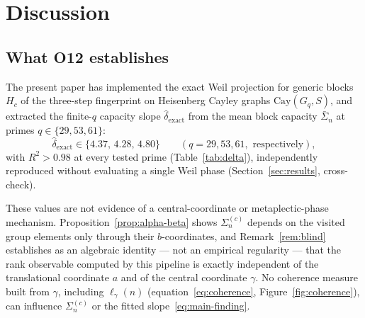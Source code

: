 \section{Discussion}
  \label{sec:discussion}

  \subsection{What O12 establishes}

    The present paper has implemented the exact Weil projection for generic blocks
    $H_c$ of the three-step fingerprint on Heisenberg Cayley graphs $\mathrm{Cay}(G_q, S)$,
    and extracted the finite-$q$ capacity slope $\hat{\delta}_{\mathrm{exact}}$ from the mean
    block capacity $\bar{\Sigma}_n$ at primes $q\in\{29,53,61\}$:
    \begin{equation}
      \hat{\delta}_{\mathrm{exact}} \in \{4.37,\,4.28,\,4.80\}
      \qquad (q=29,53,61,\text{ respectively}),
      \label{eq:main-finding}
    \end{equation}
    with $R^2 > 0.98$ at every tested prime (Table~\ref{tab:delta}), independently
    reproduced without evaluating a single Weil phase (Section~\ref{sec:results},
    cross-check).

    These values are not evidence of a central-coordinate or metaplectic-phase mechanism.
    Proposition~\ref{prop:alpha-beta} shows $\Sigma_n^{(c)}$ depends on the visited group
    elements only through their $b$-coordinates, and Remark~\ref{rem:blind} establishes as
    an algebraic identity — not an empirical regularity — that the rank observable computed
    by this pipeline is exactly independent of the translational coordinate $a$ and of the
    central coordinate $\gamma$.
    No coherence measure built from $\gamma$, including $\ell_\gamma(n)$
    (equation~\eqref{eq:coherence}, Figure~\ref{fig:coherence}), can influence
    $\Sigma_n^{(c)}$ or the fitted slope~\eqref{eq:main-finding}.

